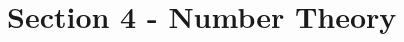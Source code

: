 \documentclass[../../Main.tex]{subfiles}
\begin{document}
\chapter{Section 4 - Number Theory}





\setcounter{section}{5} %



\end{document}
